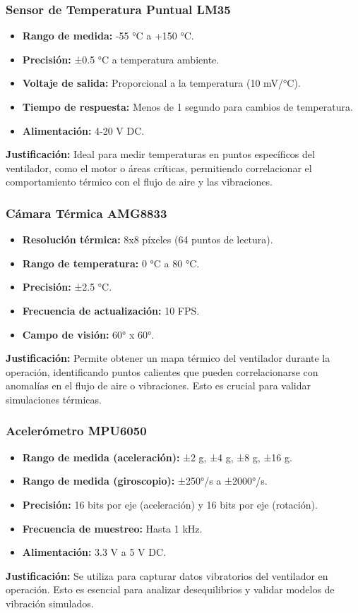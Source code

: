 \documentclass[journal,article,submit,pdftex,moreauthors]{Definitions/mdpi}
\begin{document}
\subsubsection{Sensor de Temperatura Puntual LM35}
\begin{itemize}
    \item \textbf{Rango de medida:} -55 °C a +150 °C.
    \item \textbf{Precisión:} ±0.5 °C a temperatura ambiente.
    \item \textbf{Voltaje de salida:} Proporcional a la temperatura (10 mV/°C).
    \item \textbf{Tiempo de respuesta:} Menos de 1 segundo para cambios de temperatura.
    \item \textbf{Alimentación:} 4-20 V DC.
\end{itemize}
\textbf{Justificación:} Ideal para medir temperaturas en puntos específicos del ventilador, como el motor o áreas críticas, permitiendo correlacionar el comportamiento térmico con el flujo de aire y las vibraciones.

\subsubsection{Cámara Térmica AMG8833}
\begin{itemize}
    \item \textbf{Resolución térmica:} 8x8 píxeles (64 puntos de lectura).
    \item \textbf{Rango de temperatura:} 0 °C a 80 °C.
    \item \textbf{Precisión:} ±2.5 °C.
    \item \textbf{Frecuencia de actualización:} 10 FPS.
    \item \textbf{Campo de visión:} 60° x 60°.
\end{itemize}
\textbf{Justificación:} Permite obtener un mapa térmico del ventilador durante la operación, identificando puntos calientes que pueden correlacionarse con anomalías en el flujo de aire o vibraciones. Esto es crucial para validar simulaciones térmicas.

\subsubsection{Acelerómetro MPU6050}
\begin{itemize}
    \item \textbf{Rango de medida (aceleración):} ±2 g, ±4 g, ±8 g, ±16 g.
    \item \textbf{Rango de medida (giroscopio):} ±250°/s a ±2000°/s.
    \item \textbf{Precisión:} 16 bits por eje (aceleración) y 16 bits por eje (rotación).
    \item \textbf{Frecuencia de muestreo:} Hasta 1 kHz.
    \item \textbf{Alimentación:} 3.3 V a 5 V DC.
\end{itemize}
\textbf{Justificación:} Se utiliza para capturar datos vibratorios del ventilador en operación. Esto es esencial para analizar desequilibrios y validar modelos de vibración simulados.
\end{document}
